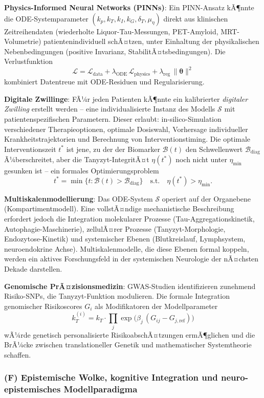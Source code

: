 ﻿\documentclass[12pt,a4paper]{article}
\theoremstyle{definition}
\begin{document}
	\textbf{Physics-Informed Neural Networks (PINNs)}: Ein PINN-Ansatz kÃ¶nnte die ODE-Systemparameter $(k_p, k_T, k_I, k_G, \delta_T, \mu_\eta)$ direkt aus klinischen Zeitreihendaten (wiederholte Liquor-Tau-Messungen, PET-Amyloid, MRT-Volumetrie) patientenindividuell schÃ¤tzen, unter Einhaltung der physikalischen Nebenbedingungen (positive Invarianz, StabilitÃ¤tsbedingungen). Die Verlustfunktion
	\[
	\mathcal{L} = \mathcal{L}_{\text{data}} + \lambda_{\text{ODE}}\,\mathcal{L}_{\text{physics}} + \lambda_{\text{reg}}\,\|\boldsymbol{\theta}\|^2
	\]
	kombiniert Datentreue mit ODE-Residuen und Regularisierung.

	\textbf{Digitale Zwillinge}: FÃ¼r jeden Patienten kÃ¶nnte ein kalibrierter \emph{digitaler Zwilling} erstellt werden -- eine individualisierte Instanz des Modells $\mathcal{S}$ mit patientenspezifischen Parametern. Dieser erlaubt: in-silico-Simulation verschiedener Therapieoptionen, optimale Dosiswahl, Vorhersage individueller Krankheitstrajektorien und Berechnung von Interventionstiming. Die optimale Interventionszeit $t^*$ ist jene, zu der der Biomarker $\mathcal{B}(t)$ den Schwellenwert $\mathcal{B}_{\text{diag}}$ Ã¼berschreitet, aber die Tanyzyt-IntegritÃ¤t $\eta(t^*)$ noch nicht unter $\eta_{\min}$ gesunken ist -- ein formales Optimierungsproblem
	\[
	t^* = \min\bigl\{t : \mathcal{B}(t) > \mathcal{B}_{\text{diag}}\bigr\} \quad \text{s.t.} \quad \eta(t^*) > \eta_{\min}.
	\]

	\textbf{Multiskalenmodellierung}: Das ODE-System $\mathcal{S}$ operiert auf der Organebene (Kompartimentmodell). Eine vollstÃ¤ndige mechanistische Beschreibung erfordert jedoch die Integration molekularer Prozesse (Tau-Aggregationskinetik, Autophagie-Maschinerie), zellulÃ¤rer Prozesse (Tanyzyt-Morphologie, Endozytose-Kinetik) und systemischer Ebenen (Blutkreislauf, Lymphsystem, neuroendokrine Achse). Multiskalenmodelle, die diese Ebenen formal koppeln, werden ein aktives Forschungsfeld in der systemischen Neurologie der nÃ¤chsten Dekade darstellen.

	\textbf{Genomische PrÃ¤zisionsmedizin}: GWAS-Studien identifizieren zunehmend Risiko-SNPs, die Tanyzyt-Funktion modulieren. Die formale Integration genomischer Risikoscores $G_i$ als Modifikatoren der Modellparameter
	\[
	k_T^{(i)} = k_T \cdot \prod_j \exp\!\bigl(\beta_j\,(G_{ij} - G_{j,\text{ref}})\bigr)
	\]
	wÃ¼rde genetisch personalisierte RisikoabschÃ¤tzungen ermÃ¶glichen und die BrÃ¼cke zwischen translationeller Genetik und mathematischer Systemtheorie schaffen.

	\subsubsection*{(F) Epistemische Wolke, kognitive Integration und neuro-epistemisches Modellparadigma}
\end{document}
